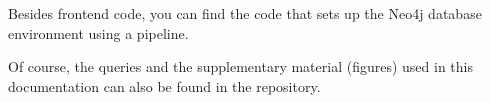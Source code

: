 \documentclass{Configuration_Files/PoliMi3i_thesis}
\begin{document}
Besides frontend code, you can find the code that sets up the Neo4j database environment using a pipeline.

Of course, the queries and the supplementary material (figures) used in this documentation can also be found in the repository.



\end{document}
